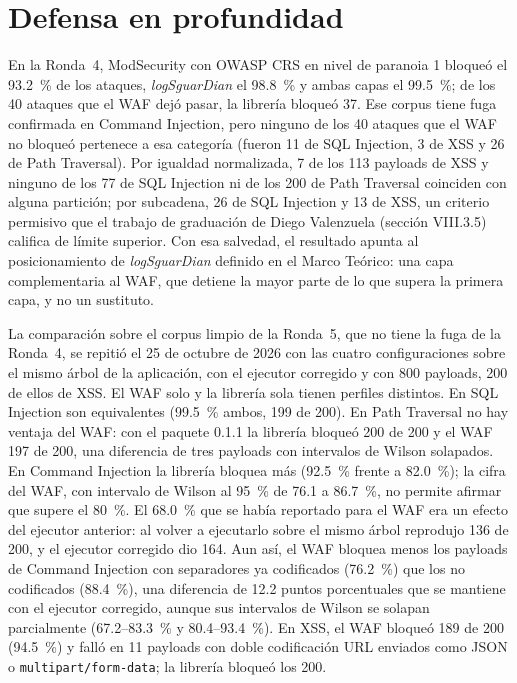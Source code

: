 \section{Defensa en profundidad}
\label{sec:dis-defensa}

En la Ronda~4, ModSecurity con OWASP CRS en nivel de paranoia 1 bloqueó el 93.2~\% de los ataques,
\textit{logSguarDian} el 98.8~\% y ambas capas el 99.5~\%; de los 40 ataques que el WAF dejó pasar,
la librería bloqueó 37. Ese corpus tiene fuga confirmada en Command Injection, pero ninguno de los
40 ataques que el WAF no bloqueó pertenece a esa categoría (fueron 11 de SQL Injection, 3 de XSS y
26 de Path Traversal). Por igualdad normalizada, 7 de los 113 payloads de XSS y ninguno de los 77
de SQL Injection ni de los 200 de Path Traversal coinciden con alguna partición; por subcadena,
26 de SQL Injection y 13 de XSS, un criterio permisivo que el trabajo de graduación de Diego
Valenzuela \cite{valenzuela2026ia} (sección VIII.3.5) califica de límite superior. Con esa salvedad, el resultado apunta al
posicionamiento de \textit{logSguarDian} definido en el Marco Teórico: una capa complementaria al
WAF, que detiene la mayor parte de lo que supera la primera capa, y no un sustituto.

La comparación sobre el corpus limpio de la Ronda~5, que no tiene la fuga de la Ronda~4, se repitió
el 25 de octubre de 2026 con las cuatro configuraciones sobre el mismo árbol de la aplicación, con
el ejecutor corregido y con 800 payloads, 200 de ellos de XSS. El WAF solo y la librería sola tienen
perfiles distintos. En SQL Injection son equivalentes (99.5~\% ambos, 199 de 200). En Path
Traversal no hay ventaja del WAF: con el paquete 0.1.1 la librería bloqueó 200 de 200 y el WAF
197 de 200, una diferencia de tres payloads con intervalos de Wilson solapados. En Command
Injection la librería bloquea más (92.5~\% frente a 82.0~\%); la cifra del WAF, con intervalo de
Wilson al 95~\% de 76.1 a 86.7~\%, no permite afirmar que supere el 80~\%. El 68.0~\% que se había
reportado para el WAF era un efecto del ejecutor anterior: al volver a ejecutarlo sobre el mismo
árbol reprodujo 136 de 200, y el ejecutor corregido dio 164. Aun así, el WAF bloquea menos los
payloads de Command Injection con separadores ya codificados (76.2~\%) que los no codificados
(88.4~\%), una diferencia de 12.2 puntos porcentuales que se mantiene con el ejecutor corregido,
aunque sus intervalos de Wilson se solapan parcialmente (67.2--83.3~\% y 80.4--93.4~\%). En XSS, el WAF bloqueó 189 de 200 (94.5~\%) y falló en 11 payloads con doble
codificación URL enviados como JSON o \texttt{multipart/form-data}; la librería bloqueó los 200.

